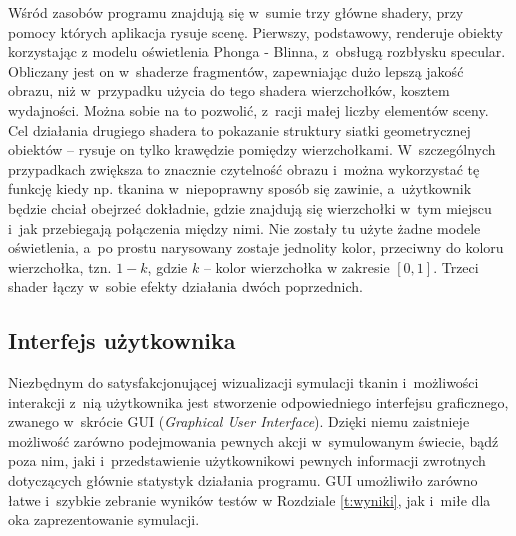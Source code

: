 		Wśród zasobów programu znajdują się w~sumie trzy główne shadery, przy pomocy których aplikacja rysuje scenę. Pierwszy, podstawowy, renderuje obiekty korzystając z modelu oświetlenia Phonga - Blinna, z~obsługą rozbłysku specular. Obliczany jest on w~shaderze fragmentów, zapewniając dużo lepszą jakość obrazu, niż w~przypadku użycia do tego shadera wierzchołków, kosztem wydajności. Można sobie na to pozwolić, z~racji małej liczby elementów sceny. Cel działania drugiego shadera to pokazanie struktury siatki geometrycznej obiektów -- rysuje on tylko krawędzie pomiędzy wierzchołkami. W~szczególnych przypadkach zwiększa to znacznie czytelność obrazu i~można wykorzystać tę funkcję kiedy np. tkanina w~niepoprawny sposób się zawinie, a~użytkownik będzie chciał obejrzeć dokładnie, gdzie znajdują się wierzchołki w~tym miejscu i~jak przebiegają połączenia między nimi. Nie zostały tu użyte żadne modele oświetlenia, a~po prostu narysowany zostaje jednolity kolor, przeciwny do koloru wierzchołka, tzn. \(1 - k\), gdzie \(k\) -- kolor wierzchołka w zakresie \([0, 1]\). Trzeci shader łączy w~sobie efekty działania dwóch poprzednich.
		
		\subsection{Interfejs użytkownika}
		\label{t:praktyka:silnik:gui}
		
		
		Niezbędnym do satysfakcjonującej wizualizacji symulacji tkanin i~możliwości interakcji z~nią użytkownika jest stworzenie odpowiedniego interfejsu graficznego, zwanego w~skrócie GUI (\emph{Graphical User Interface}). Dzięki niemu zaistnieje możliwość zarówno podejmowania pewnych akcji w~symulowanym świecie, bądź poza nim, jaki i~przedstawienie użytkownikowi pewnych informacji zwrotnych dotyczących głównie statystyk działania programu. GUI umożliwiło zarówno łatwe i~szybkie zebranie wyników testów w Rozdziale \ref{t:wyniki}, jak i~miłe dla oka zaprezentowanie symulacji.
		
